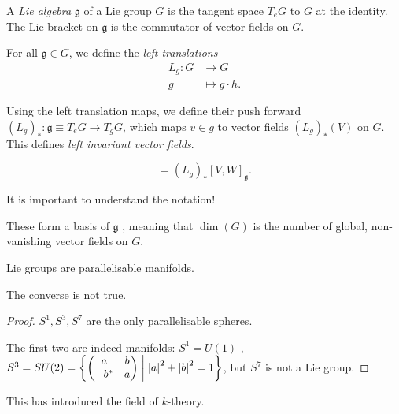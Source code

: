 \begin{definition}[]
  A \emph{Lie algebra} $\mathfrak{g}$ of a Lie group $G$ is the tangent space $T_e G$ to $G$ at the identity.
  The Lie bracket on $\mathfrak{g}$ is the commutator of vector fields on $G$.
\end{definition}

\begin{definition}
  For all $\mathfrak{g} \in G$, we define the \emph{left translations} 
  \begin{align}
    L_g \colon G &\to G \\
    g &\mapsto g \cdot h.
  \end{align}
\end{definition}
\begin{definition}
  Using the left translation maps, we define their push forward $(L_g)_* \colon \mathfrak{g} \equiv T_e G \to T_g G$, which maps $v \in g$ to vector fields $(L_g)_* (V)$ on $G$.
  This defines \emph{left invariant vector fields}.
\end{definition}
\begin{equation}
  [(L_g)_* V, (L_g)_* W] = (L_g)_* [V, W]_\mathfrak{g}.
\end{equation}
\begin{remark}
  It is important to understand the notation!
\end{remark}

These form a basis of $\mathfrak{g}$ , meaning that $\dim(G)$  is the number of global, non-vanishing vector fields on $G$.
\begin{claim}
  Lie groups are parallelisable manifolds.
\end{claim}
\begin{claim}
  The converse is not true.
\end{claim}
\begin{proof}
  $S^1, S^3, S^7$  are the only parallelisable spheres.

  The first two are indeed manifolds:
  $S^1 = U(1)$ , $S^3 = SU(2) = \left\{ 
    \begin{pmatrix}
     a & b \\
     -b^* & a \\
    \end{pmatrix} \suchthat \abs{a}^2 + \abs{b}^2 = 1
  \right\}$,
  but $S^7$ is not a Lie group.
\end{proof}
\begin{leftbar}
  This has introduced the field of $k$-theory.
\end{leftbar}

